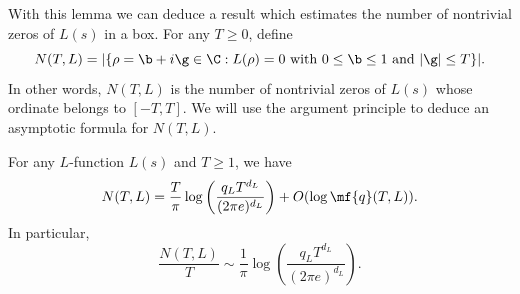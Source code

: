 \documentclass[12pt]{article}
\begin{document}
      With this lemma we can deduce a result which estimates the number of nontrivial zeros of \(L(s)\) in a box. For any \(T \ge 0\), define
      \[
        N(T,L) = |\{\rho = \b+i\g \in \C:L(\rho) = 0 \text{ with } 0 \le \b \le 1 \text{ and } |\g| \le T\}|.
      \]
      In other words, \(N(T,L)\) is the number of nontrivial zeros of \(L(s)\) whose ordinate belongs to \([-T,T]\). We will use the argument principle to deduce an asymptotic formula for \(N(T,L)\).

      \begin{theorem}\label{thm:zero_counting}
        For any \(L\)-function \(L(s)\) and \(T \ge 1\), we have
        \[
          N(T,L) = \frac{T}{\pi}\log\left(\frac{q_{L}T^{d_{L}}}{(2\pi e)^{d_{L}}}\right)+O(\log{\mf{q}(T,L)}).
        \]
        In particular,
        \[
          \frac{N(T,L)}{T} \sim \frac{1}{\pi}\log\left(\frac{q_{L}T^{d_{L}}}{(2\pi e)^{d_{L}}}\right).
        \]
      \end{theorem}
\end{document}

